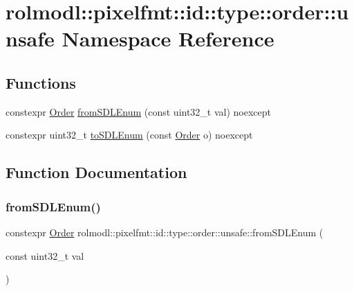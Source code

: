 \hypertarget{namespacerolmodl_1_1pixelfmt_1_1id_1_1type_1_1order_1_1unsafe}{}\section{rolmodl\+::pixelfmt\+::id\+::type\+::order\+::unsafe Namespace Reference}
\label{namespacerolmodl_1_1pixelfmt_1_1id_1_1type_1_1order_1_1unsafe}
\subsection*{Functions}
\begin{DoxyCompactItemize}
\item 
constexpr \mbox{\hyperlink{namespacerolmodl_1_1pixelfmt_1_1id_1_1type_a01a03db37a556bc98643bd88b2f5b6b3}{Order}} \mbox{\hyperlink{namespacerolmodl_1_1pixelfmt_1_1id_1_1type_1_1order_1_1unsafe_a6c5a80730352025df8c4239e36e523cf}{from\+S\+D\+L\+Enum}} (const uint32\+\_\+t val) noexcept
\item 
constexpr uint32\+\_\+t \mbox{\hyperlink{namespacerolmodl_1_1pixelfmt_1_1id_1_1type_1_1order_1_1unsafe_a024d2e14288cf53b70e892eb4250a02c}{to\+S\+D\+L\+Enum}} (const \mbox{\hyperlink{namespacerolmodl_1_1pixelfmt_1_1id_1_1type_a01a03db37a556bc98643bd88b2f5b6b3}{Order}} o) noexcept
\end{DoxyCompactItemize}


\subsection{Function Documentation}
\mbox{\label{namespacerolmodl_1_1pixelfmt_1_1id_1_1type_1_1order_1_1unsafe_a6c5a80730352025df8c4239e36e523cf}} 
\subsubsection{\texorpdfstring{fromSDLEnum()}{fromSDLEnum()}}
{\footnotesize\ttfamily constexpr \mbox{\hyperlink{namespacerolmodl_1_1pixelfmt_1_1id_1_1type_a01a03db37a556bc98643bd88b2f5b6b3}{Order}} rolmodl\+::pixelfmt\+::id\+::type\+::order\+::unsafe\+::from\+S\+D\+L\+Enum (\begin{DoxyParamCaption}\item[{const uint32\+\_\+t}]{val }\end{DoxyParamCaption})\hspace{0.3cm}{\ttfamily [noexcept]}}



